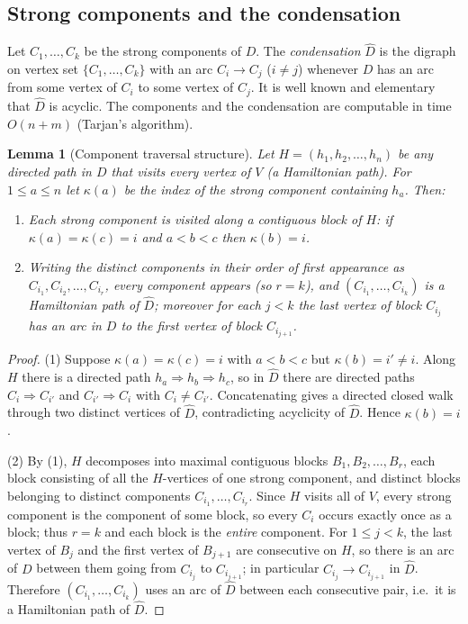 \documentclass[12pt]{article}
\newtheorem{lemma}{Lemma}
\theoremstyle{definition}
\newcommand{\Vv}{V}
\begin{document}
\subsection{Strong components and the condensation}

Let $C_{1},\dots,C_{k}$ be the strong components of $D$. The \emph{condensation}
$\widehat D$ is the digraph on vertex set $\{C_{1},\dots,C_{k}\}$ with an arc
$C_{i}\to C_{j}$ ($i\neq j$) whenever $D$ has an arc from some vertex of $C_{i}$ to
some vertex of $C_{j}$. It is well known and elementary that $\widehat D$ is
acyclic. The components and the condensation are computable in time $O(n+m)$
(Tarjan's algorithm).

\begin{lemma}[Component traversal structure]\label{lem:traversal}
Let $H=(h_{1},h_{2},\dots,h_{n})$ be any directed path in $D$ that visits every
vertex of $\Vv$ (a Hamiltonian path). For $1\le a\le n$ let $\kappa(a)$ be the
index of the strong component containing $h_{a}$. Then:
\begin{enumerate}
\item Each strong component is visited along a contiguous block of $H$: if
$\kappa(a)=\kappa(c)=i$ and $a<b<c$ then $\kappa(b)=i$.
\item Writing the distinct components in their order of first appearance as
$C_{i_{1}},C_{i_{2}},\dots,C_{i_{r}}$, every component appears (so $r=k$), and
$(C_{i_{1}},\dots,C_{i_{k}})$ is a Hamiltonian path of $\widehat D$; moreover for
each $j<k$ the last vertex of block $C_{i_{j}}$ has an arc in $D$ to the first
vertex of block $C_{i_{j+1}}$.
\end{enumerate}
\end{lemma}

\begin{proof}
(1) Suppose $\kappa(a)=\kappa(c)=i$ with $a<b<c$ but $\kappa(b)=i'\neq i$. Along
$H$ there is a directed path $h_{a}\Rightarrow h_{b}\Rightarrow h_{c}$, so in
$\widehat D$ there are directed paths $C_{i}\Rightarrow C_{i'}$ and
$C_{i'}\Rightarrow C_{i}$ with $C_{i}\neq C_{i'}$. Concatenating gives a directed
closed walk through two distinct vertices of $\widehat D$, contradicting acyclicity
of $\widehat D$. Hence $\kappa(b)=i$.

(2) By (1), $H$ decomposes into maximal contiguous blocks $B_{1},B_{2},\dots,B_{r}$,
each block consisting of all the $H$-vertices of one strong component, and distinct
blocks belonging to distinct components $C_{i_{1}},\dots,C_{i_{r}}$. Since $H$
visits all of $\Vv$, every strong component is the component of some block, so
every $C_{i}$ occurs exactly once as a block; thus $r=k$ and each block is the
\emph{entire} component. For $1\le j<k$, the last vertex of $B_{j}$ and the first
vertex of $B_{j+1}$ are consecutive on $H$, so there is an arc of $D$ between them
going from $C_{i_{j}}$ to $C_{i_{j+1}}$; in particular $C_{i_{j}}\to C_{i_{j+1}}$ in
$\widehat D$. Therefore $(C_{i_{1}},\dots,C_{i_{k}})$ uses an arc of $\widehat D$
between each consecutive pair, i.e.\ it is a Hamiltonian path of $\widehat D$.
\end{proof}
\end{document}
